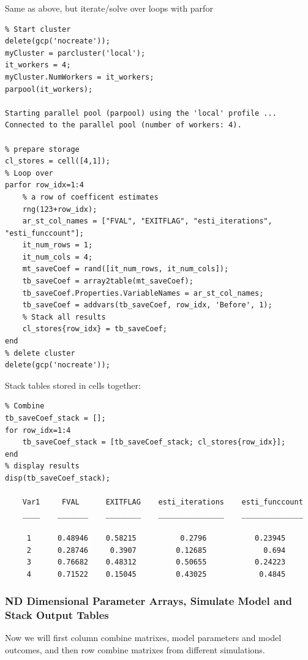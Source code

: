 \documentclass[
]{book}
\begin{document}
Same as above, but iterate/solve over loops with parfor

\begin{verbatim}
% Start cluster
delete(gcp('nocreate'));
myCluster = parcluster('local');
it_workers = 4;
myCluster.NumWorkers = it_workers;
parpool(it_workers);

Starting parallel pool (parpool) using the 'local' profile ...
Connected to the parallel pool (number of workers: 4).

% prepare storage
cl_stores = cell([4,1]);
% Loop over
parfor row_idx=1:4
    % a row of coefficent estimates
    rng(123+row_idx);    
    ar_st_col_names = ["FVAL", "EXITFLAG", "esti_iterations", "esti_funccount"];
    it_num_rows = 1;
    it_num_cols = 4;
    mt_saveCoef = rand([it_num_rows, it_num_cols]);        
    tb_saveCoef = array2table(mt_saveCoef);
    tb_saveCoef.Properties.VariableNames = ar_st_col_names;
    tb_saveCoef = addvars(tb_saveCoef, row_idx, 'Before', 1);    
    % Stack all results
    cl_stores{row_idx} = tb_saveCoef;
end
% delete cluster
delete(gcp('nocreate'));
\end{verbatim}

Stack tables stored in cells together:

\begin{verbatim}
% Combine
tb_saveCoef_stack = [];
for row_idx=1:4
    tb_saveCoef_stack = [tb_saveCoef_stack; cl_stores{row_idx}];
end
% display results
disp(tb_saveCoef_stack);

    Var1     FVAL      EXITFLAG    esti_iterations    esti_funccount
    ____    _______    ________    _______________    ______________

     1      0.48946    0.58215          0.2796           0.23945    
     2      0.28746     0.3907         0.12685             0.694    
     3      0.76682    0.48312         0.50655           0.24223    
     4      0.71522    0.15045         0.43025            0.4845    
\end{verbatim}

\hypertarget{nd-dimensional-parameter-arrays-simulate-model-and-stack-output-tables}{%
\subsubsection{ND Dimensional Parameter Arrays, Simulate Model and Stack Output Tables}\label{nd-dimensional-parameter-arrays-simulate-model-and-stack-output-tables}}

Now we will first column combine matrixes, model parameters and model
outcomes, and then row combine matrixes from different simulations.
\end{document}
